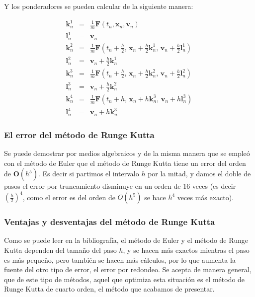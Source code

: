 Y los ponderadores se pueden calcular de la siguiente manera:

\begin{eqnarray}
\textbf{k}_{n}^{1} & = & \frac{1}{m}\textbf{F}(t_n, \textbf{x}_n, \textbf{v}_n) \nonumber \\
\textbf{l}_{n}^{1} & = & \textbf{v}_n \nonumber \\
\textbf{k}_{n}^{2} & = & \frac{1}{m}\textbf{F}(t_n + \frac{h}{2}, \, \textbf{x}_n + \frac{h}{2}\textbf{k}_{n}^{1}, \, \textbf{v}_n + \frac{h}{2}\textbf{l}_{n}^{1}) \nonumber \\
\textbf{l}_{n}^{2} & = & \textbf{v}_n + \frac{h}{2}\textbf{k}_{n}^{1} \nonumber \\
\textbf{k}_{n}^{3} & = & \frac{1}{m}\textbf{F}(t_n + \frac{h}{2}, \, \textbf{x}_n + \frac{h}{2}\textbf{k}_{n}^{2}, \, \textbf{v}_n + \frac{h}{2}\textbf{l}_{n}^{2}) \nonumber \\
\textbf{l}_{n}^{3} & = & \textbf{v}_n + \frac{h}{2}\textbf{k}_{n}^{2} \nonumber \\
\textbf{k}_{n}^{4} & = & \frac{1}{m}\textbf{F}(t_n + h, \, \textbf{x}_n +h\textbf{k}_{n}^{3}, \, \textbf{v}_n + h\textbf{l}_{n}^{3}) \nonumber \\
\textbf{l}_{n}^{4} & = & \textbf{v}_n + h\textbf{k}_{n}^{3}
\label{ponderadores:RK4}
\end{eqnarray}

\subsubsection{El error del método de Runge Kutta}
Se puede demostrar por medios algebraicos y de la misma manera que se empleó con el método de Euler que el método de Runge Kutta tiene un error del orden de $\textbf{O}(h^5)$.
Es decir si partimos el intervalo $h$ por la mitad, y damos el doble de pasos el error por truncamiento disminuye en un orden de 16 veces (es decir $\left( \frac{h}{2} \right)^4$, como el error es del orden de $O(h^5)$ se hace $h^4$ veces más exacto).

\subsubsection{Ventajas y desventajas del método de Runge Kutta}
Como se puede leer en la bibliografía, el método de Euler y el método de Runge Kutta dependen del tamaño del paso $h$, y se hacen más exactos mientras el paso es más pequeño, pero también se hacen más cálculos, por lo que aumenta la fuente del otro tipo de error, el error por redondeo.
Se acepta de manera general, que de este tipo de métodos, aquel que optimiza esta situación es el método de Runge Kutta de cuarto orden, el método que acabamos de presentar.

